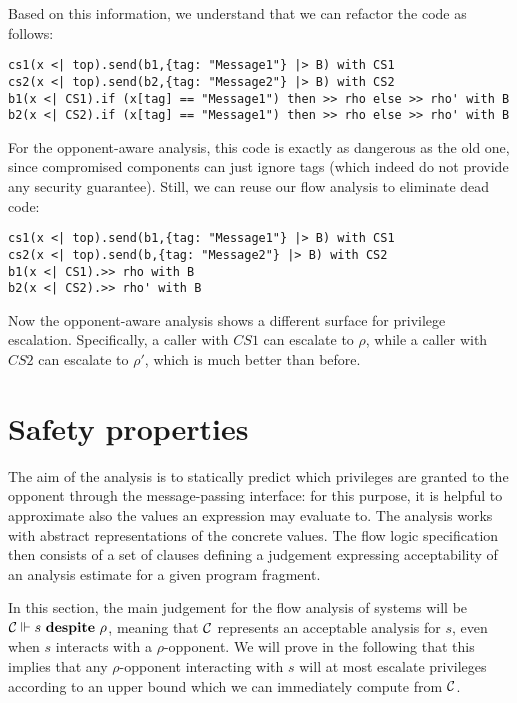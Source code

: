 Based on this information, we understand that we can refactor the code as follows:
\begin{verbatim}
cs1(x <| top).send(b1,{tag: "Message1"} |> B) with CS1
cs2(x <| top).send(b2,{tag: "Message2"} |> B) with CS2
b1(x <| CS1).if (x[tag] == "Message1") then >> rho else >> rho' with B
b2(x <| CS2).if (x[tag] == "Message1") then >> rho else >> rho' with B
\end{verbatim}
For the opponent-aware analysis, this code is exactly as dangerous as the old one, since compromised components can just ignore tags (which indeed do not provide any security guarantee). Still, we can reuse our flow analysis to eliminate dead code:
\begin{verbatim}
cs1(x <| top).send(b1,{tag: "Message1"} |> B) with CS1
cs2(x <| top).send(b,{tag: "Message2"} |> B) with CS2
b1(x <| CS1).>> rho with B
b2(x <| CS2).>> rho' with B
\end{verbatim}
Now the opponent-aware analysis shows a different surface for privilege escalation. Specifically, a caller with $CS1$ can escalate to $\rho$, while a caller with $CS2$ can escalate to $\rho'$, which is much better than before.

\section{Safety properties} 
\label{sec:SafetyProp}
The aim of the analysis is to statically predict which privileges
are granted to the opponent through the message-passing interface:
for this purpose, it is helpful to approximate also the values an
expression may evaluate to. The analysis works with abstract
representations of the concrete values. The flow logic specification
then consists of a set of clauses defining a judgement expressing
acceptability of an analysis estimate for a given program fragment.

In this section, the main judgement for the flow analysis of systems
will be ${\cal C}\Vdash s \ \mathbf{despite}\ \rho$, meaning that ${\cal C}$ represents
an acceptable analysis for $s$, even when $s$ interacts with a $\rho$-opponent.
We will prove in the following that this implies that any $\rho$-opponent
interacting with $s$ will at most escalate privileges according to an
upper bound which we can immediately compute from ${\cal C}$.

